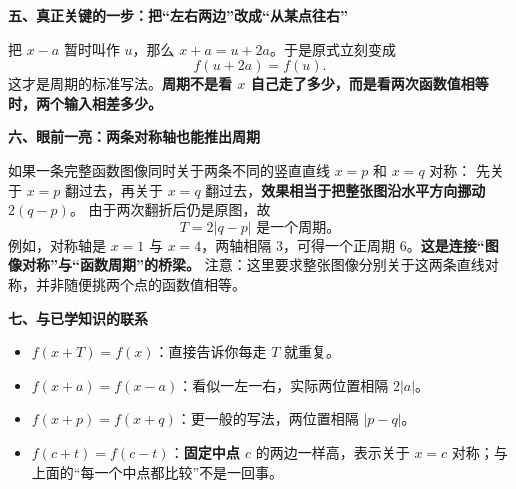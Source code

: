 \clearpage
\begin{explanationbox}
\textbf{\textcolor{CExplanation}{五、真正关键的一步：把“左右两边”改成“从某点往右”}}



把 $x-a$ 暂时叫作 $u$，那么 $x+a=u+2a$。于是原式立刻变成
\[
f(u+2a)=f(u).
\]
这才是周期的标准写法。\textbf{周期不是看 $x$ 自己走了多少，而是看两次函数值相等时，两个输入相差多少。}

\medskip

\end{explanationbox}
\clearpage
\begin{explanationbox}
\textbf{\textcolor{CExplanation}{六、眼前一亮：两条对称轴也能推出周期}}



如果一条完整函数图像同时关于两条不同的竖直直线 $x=p$ 和 $x=q$ 对称：
先关于 $x=p$ 翻过去，再关于 $x=q$ 翻过去，\textbf{效果相当于把整张图沿水平方向挪动 $2(q-p)$}。
由于两次翻折后仍是原图，故
\[
\boxed{T=2|q-p|\text{ 是一个周期。}}
\]
例如，对称轴是 $x=1$ 与 $x=4$，两轴相隔 $3$，可得一个正周期 $6$。\textbf{这是连接“图像对称”与“函数周期”的桥梁。} 注意：这里要求整张图像分别关于这两条直线对称，并非随便挑两个点的函数值相等。

\medskip

\end{explanationbox}
\clearpage
\begin{explanationbox}
\textbf{\textcolor{CExplanation}{七、与已学知识的联系}}


\begin{itemize}[leftmargin=*,itemsep=.35em]
\item $f(x+T)=f(x)$：直接告诉你每走 $T$ 就重复。
\item $f(x+a)=f(x-a)$：看似一左一右，实际两位置相隔 $2|a|$。
\item $f(x+p)=f(x+q)$：更一般的写法，两位置相隔 $|p-q|$。
\item $f(c+t)=f(c-t)$：\textbf{固定中点 $c$} 的两边一样高，表示关于 $x=c$ 对称；与上面的“每一个中点都比较”不是一回事。
\end{itemize}
\end{explanationbox}
